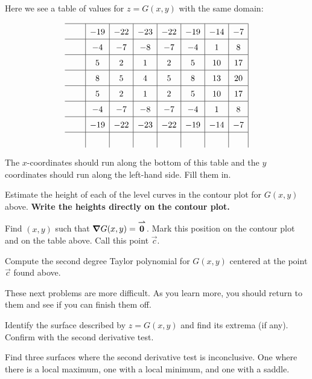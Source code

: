 \documentclass[handout,noauthor,nooutcomes]{ximera}
\begin{document}
\begin{problem}
Here we see a table of values for $z= G(x,y)$ with the same domain:

\[
\renewcommand*{\arraystretch}{1.5}
\begin{array}{c|c|c|c|c|c|c|c|}\hline
\rule{.5cm}{0cm}& -19 & -22 & -23 & -22 & -19 & -14 & -7 \\\hline
& -4 & -7 & -8 & -7 & -4 & 1 & 8 \\\hline
& 5 & 2 & 1 & 2 & 5 & 10 & 17 \\\hline
& 8 & 5 & 4 & 5 & 8 & 13 & 20 \\\hline
& 5 & 2 & 1 & 2 & 5 & 10 & 17 \\\hline
& -4 & -7 & -8 & -7 & -4 & 1 & 8 \\\hline
& -19 & -22 & -23 & -22 & -19 & -14 & -7 \\\hline
  &    &    &    &    &   &    & 
\end{array}
\]

The $x$-coordinates should run along the bottom of this table and the
$y$ coordinates should run along the left-hand side. Fill them in.
\end{problem}

\begin{problem}
Estimate the height of each of the level curves in the contour plot
for $G(x,y)$ above. \textbf{Write the heights directly on the contour
  plot.}
\end{problem}

\begin{problem}
Find $(x,y)$ such that $\boldsymbol\nabla G(x,y) = {\overset{\boldsymbol{\rightharpoonup}}{\mathbf{0}}}$. Mark this position on the
contour plot and on the table above. Call this point $\vec{c}$.
\end{problem}


\begin{problem}
  Compute the second degree Taylor polynomial for $G(x,y)$ centered at
  the point $\vec{c}$ found above.
\end{problem}



These next problems are more difficult. As you learn more, you should
return to them and see if you can finish them off.


\begin{problem}
  Identify the surface described by $z = G(x,y)$ and find its
  extrema (if any). Confirm with the second derivative test.
\end{problem}


\begin{problem}
  Find three surfaces where the second derivative test is
  inconclusive. One where there is a local maximum, one with a local
  minimum, and one with a saddle.
\end{problem}
\end{document}
